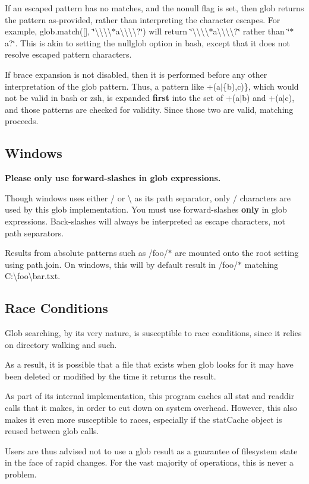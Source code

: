 If an escaped pattern has no matches, and the {\ttfamily nonull} flag is set, then glob returns the pattern as-\/provided, rather than interpreting the character escapes. For example, {\ttfamily glob.\+match(\mbox{[}\mbox{]}, \char`\"{}\textbackslash{}\textbackslash{}\textbackslash{}\textbackslash{}$\ast$a\textbackslash{}\textbackslash{}\textbackslash{}\textbackslash{}?\char`\"{})} will return {\ttfamily \char`\"{}\textbackslash{}\textbackslash{}\textbackslash{}\textbackslash{}$\ast$a\textbackslash{}\textbackslash{}\textbackslash{}\textbackslash{}?\char`\"{}} rather than {\ttfamily \char`\"{}$\ast$a?\char`\"{}}. This is akin to setting the {\ttfamily nullglob} option in bash, except that it does not resolve escaped pattern characters.

If brace expansion is not disabled, then it is performed before any other interpretation of the glob pattern. Thus, a pattern like {\ttfamily +(a$\vert$\{b),c)\}}, which would not be valid in bash or zsh, is expanded {\bfseries first} into the set of {\ttfamily +(a$\vert$b)} and {\ttfamily +(a$\vert$c)}, and those patterns are checked for validity. Since those two are valid, matching proceeds.

\subsection*{Windows}

{\bfseries Please only use forward-\/slashes in glob expressions.}

Though windows uses either {\ttfamily /} or {\ttfamily \textbackslash{}} as its path separator, only {\ttfamily /} characters are used by this glob implementation. You must use forward-\/slashes {\bfseries only} in glob expressions. Back-\/slashes will always be interpreted as escape characters, not path separators.

Results from absolute patterns such as {\ttfamily /foo/$\ast$} are mounted onto the root setting using {\ttfamily path.\+join}. On windows, this will by default result in {\ttfamily /foo/$\ast$} matching {\ttfamily C\+:\textbackslash{}foo\textbackslash{}bar.\+txt}.

\subsection*{Race Conditions}

Glob searching, by its very nature, is susceptible to race conditions, since it relies on directory walking and such.

As a result, it is possible that a file that exists when glob looks for it may have been deleted or modified by the time it returns the result.

As part of its internal implementation, this program caches all stat and readdir calls that it makes, in order to cut down on system overhead. However, this also makes it even more susceptible to races, especially if the stat\+Cache object is reused between glob calls.

Users are thus advised not to use a glob result as a guarantee of filesystem state in the face of rapid changes. For the vast majority of operations, this is never a problem. 
